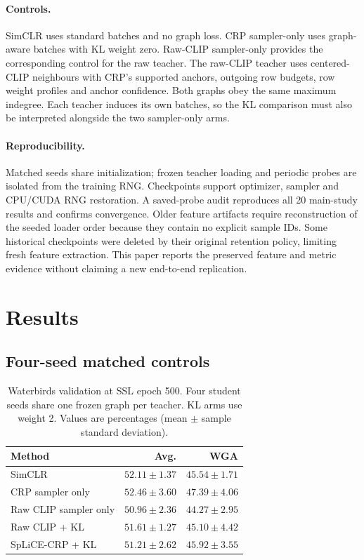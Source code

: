 \documentclass[11pt,a4paper]{article}
\begin{document}
\paragraph{Controls.}
SimCLR uses standard batches and no graph loss. CRP sampler-only uses graph-aware
batches with KL weight zero. Raw-CLIP sampler-only provides the corresponding
control for the raw teacher. The raw-CLIP teacher uses centered-CLIP neighbours
with CRP's supported anchors, outgoing row budgets, row weight profiles and
anchor confidence. Both graphs obey the same maximum indegree. Each teacher
induces its own batches, so the KL comparison must also be interpreted alongside
the two sampler-only arms.

\paragraph{Reproducibility.}
Matched seeds share initialization; frozen teacher loading and periodic probes
are isolated from the training RNG. Checkpoints support optimizer, sampler and
CPU/CUDA RNG restoration. A saved-probe audit reproduces all 20 main-study
results and confirms convergence. Older feature artifacts require reconstruction
of the seeded loader order because they contain no explicit sample IDs. Some
historical checkpoints were deleted by their original retention policy, limiting
fresh feature extraction. This paper reports the preserved feature and metric
evidence without claiming a new end-to-end replication.

\section{Results}
\subsection{Four-seed matched controls}
\begin{table}[t]
\centering
\caption{Waterbirds validation at SSL epoch 500. Four student seeds share one
frozen graph per teacher. KL arms use weight 2. Values are percentages
(mean $\pm$ sample standard deviation).}
\begin{tabular}{lrr}
\toprule
Method & Avg. & WGA \\
\midrule
SimCLR & $52.11 \pm 1.37$ & $45.54 \pm 1.71$ \\
CRP sampler only & $52.46 \pm 3.60$ & $47.39 \pm 4.06$ \\
Raw CLIP sampler only & $50.96 \pm 2.36$ & $44.27 \pm 2.95$ \\
Raw CLIP + KL & $51.61 \pm 1.27$ & $45.10 \pm 4.42$ \\
SpLiCE-CRP + KL & $51.21 \pm 2.62$ & $45.92 \pm 3.55$ \\
\bottomrule
\end{tabular}
\label{tab:main}
\end{table}
\end{document}
